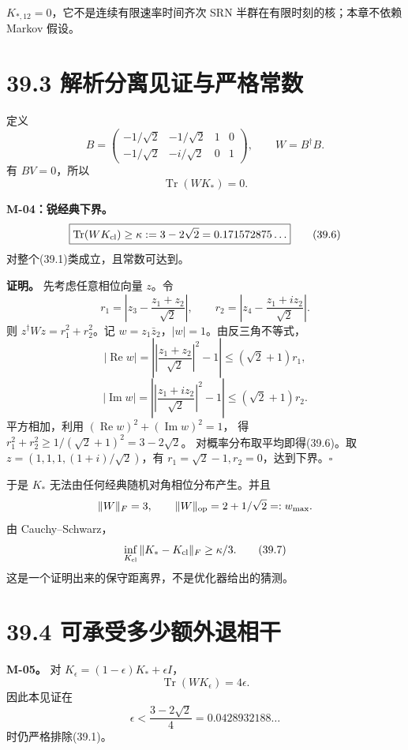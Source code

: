 \documentclass[
  11pt,
  oneside]{book}
\begin{document}
\(K_{*,12}=0\)，它不是连续有限速率时间齐次 SRN
半群在有限时刻的核；本章不依赖 Markov 假设。

\hypertarget{ux89e3ux6790ux5206ux79bbux89c1ux8bc1ux4e0eux4e25ux683cux5e38ux6570}{%
\section{39.3
解析分离见证与严格常数}\label{ux89e3ux6790ux5206ux79bbux89c1ux8bc1ux4e0eux4e25ux683cux5e38ux6570}}

定义 \[
B=\begin{pmatrix}
-1/\sqrt2&-1/\sqrt2&1&0\\
-1/\sqrt2&-i/\sqrt2&0&1
\end{pmatrix},\qquad W=B^\dagger B.
\tag{39.4}
\] 有 \(BV=0\)，所以 \[
\operatorname{Tr}(WK_*)=0.
\tag{39.5}
\]

\protect\hypertarget{m-04}{}{}

\textbf{M-04：锐经典下界。} \[
\boxed{\operatorname{Tr}(WK_{\rm cl})\ge
\kappa:=3-2\sqrt2=0.171572875\ldots}
\tag{39.6}
\] 对整个(39.1)类成立，且常数可达到。

\textbf{证明。} 先考虑任意相位向量 \(z\)。令 \[
r_1=\left|z_3-\frac{z_1+z_2}{\sqrt2}\right|,\qquad
r_2=\left|z_4-\frac{z_1+iz_2}{\sqrt2}\right|.
\] 则 \(z^\dagger Wz=r_1^2+r_2^2\)。记
\(w=z_1\bar z_2\)，\(|w|=1\)。由反三角不等式， \[
|\operatorname{Re}w|
=\left|\left|\frac{z_1+z_2}{\sqrt2}\right|^2-1\right|
\le(\sqrt2+1)r_1,
\] \[
|\operatorname{Im}w|
=\left|\left|\frac{z_1+iz_2}{\sqrt2}\right|^2-1\right|
\le(\sqrt2+1)r_2.
\] 平方相加，利用 \((\operatorname{Re}w)^2+(\operatorname{Im}w)^2=1\)，
得 \(r_1^2+r_2^2\ge1/(\sqrt2+1)^2=3-2\sqrt2\)。
对概率分布取平均即得(39.6)。取 \(z=(1,1,1,(1+i)/\sqrt2)\)，有
\(r_1=\sqrt2-1,r_2=0\)，达到下界。\(\square\)

于是 \(K_*\) 无法由任何经典随机对角相位分布产生。并且 \[
\|W\|_F=3,\qquad \|W\|_{\rm op}=2+1/\sqrt2=:w_{\max}.
\] 由 Cauchy--Schwarz， \[
\inf_{K_{\rm cl}}\|K_*-K_{\rm cl}\|_F\ge\kappa/3.
\tag{39.7}
\] 这是一个证明出来的保守距离界，不是优化器给出的猜测。

\hypertarget{ux53efux627fux53d7ux591aux5c11ux989dux5916ux9000ux76f8ux5e72}{%
\section{39.4
可承受多少额外退相干}\label{ux53efux627fux53d7ux591aux5c11ux989dux5916ux9000ux76f8ux5e72}}

\protect\hypertarget{m-05}{}{}

\textbf{M-05。} 对 \(K_\epsilon=(1-\epsilon)K_*+\epsilon I\)， \[
\operatorname{Tr}(WK_\epsilon)=4\epsilon.
\] 因此本见证在 \[
\epsilon<\frac{3-2\sqrt2}{4}=0.0428932188\ldots
\tag{39.8}
\] 时仍严格排除(39.1)。
\end{document}
